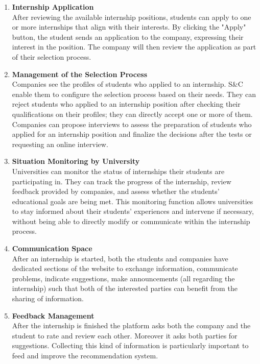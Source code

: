 \begin{enumerate}
        \item \textbf{Internship Application}
        \\ After reviewing the available internship positions, students can apply to one or more internships that align with their interests. By clicking the "Apply" button, the student sends an application to the company, expressing their interest in the position. The company will then review the application as part of their selection process.
        
        \item \textbf {Management of the Selection Process}
        \\ Companies see the profiles of students who applied to an internship. S\&C enable them to configure the selection process based on their needs. They can reject students who applied to an internship position after checking their qualifications on their profiles; they can directly accept one or more of them. Companies can propose interviews to assess the preparation of students who applied for an internship position and finalize the decisions after the tests or requesting an online interview.

        \item \textbf{Situation Monitoring by University}
        \\ Universities can monitor the status of internships their students are participating in. They can track the progress of the internship, review feedback provided by companies, and assess whether the students' educational goals are being met. This monitoring function allows universities to stay informed about their students' experiences and intervene if necessary, without being able to directly modify or communicate within the internship process.
        
        \item \textbf {Communication Space}
        \\ After an internship is started, both the students and companies have dedicated sections of the website to exchange information, communicate problems, indicate suggestions, make announcements (all regarding the internship) such that both of the interested parties can benefit from the sharing of information. 

        \item \textbf {Feedback Management}
        \\ After the internship is finished the platform asks both the company and the student to rate and review each other. Moreover it asks both parties for suggestions. Collecting this kind of information is particularly important to feed and improve the recommendation system.
        \\
    \end{enumerate}

